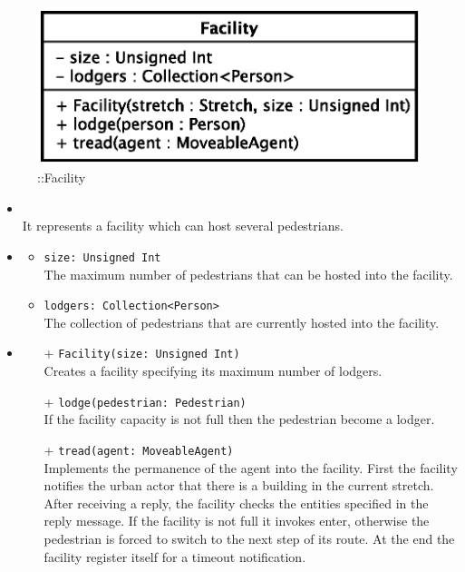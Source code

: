 \begin{figure}[h]
\centering
\includegraphics[scale=0.6,keepaspectratio]{images/solution/app/backend/facility.eps}
\caption{\pReactiveComponentStretchDecoration::Facility}
\label{fig:sd-app-facility}
\end{figure}
\FloatBarrier
\begin{itemize}
  \item \textbf{\descr} \\
    It represents a facility which can host several pedestrians.
  \item \textbf{\attrs}
  \begin{itemize}
    \item \texttt{size: Unsigned Int} \\
The maximum number of pedestrians that can be hosted into the facility.
    \item \texttt{lodgers: Collection<Person>} \\
The collection of pedestrians that are currently hosted into the facility.
  \end{itemize}
  \item \textbf{\ops}
  \begin{itemize} 
   \item[+] \texttt{Facility(size: Unsigned Int)} \\
Creates a facility specifying its maximum number of lodgers.
   \item[+] \texttt{lodge(pedestrian: Pedestrian)} \\
If the facility capacity is not full then the pedestrian become a lodger.   
\item[+] \texttt{tread(agent: MoveableAgent)} \\
Implements the permanence of the agent into the facility. First the facility notifies the urban actor that there is a building in the current stretch. After receiving a reply, the facility checks the entities specified in the reply message. If the facility is not full it invokes enter, otherwise the pedestrian is forced to switch to the next step of its route. At the end the facility register itself for a timeout notification.
  \end{itemize}
\end{itemize}
